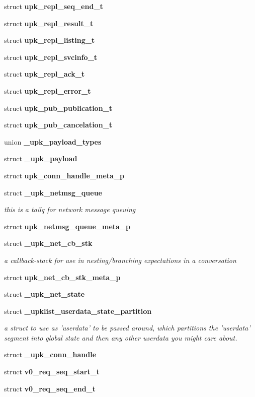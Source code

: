 \begin{DoxyCompactItemize}
\item 
struct {\bf upk\_\-repl\_\-seq\_\-end\_\-t}
\item 
struct {\bf upk\_\-repl\_\-result\_\-t}
\item 
struct {\bf upk\_\-repl\_\-listing\_\-t}
\item 
struct {\bf upk\_\-repl\_\-svcinfo\_\-t}
\item 
struct {\bf upk\_\-repl\_\-ack\_\-t}
\item 
struct {\bf upk\_\-repl\_\-error\_\-t}
\item 
struct {\bf upk\_\-pub\_\-publication\_\-t}
\item 
struct {\bf upk\_\-pub\_\-cancelation\_\-t}
\item 
union {\bf \_\-upk\_\-payload\_\-types}
\item 
struct {\bf \_\-upk\_\-payload}
\item 
struct {\bf upk\_\-conn\_\-handle\_\-meta\_\-p}
\item 
struct {\bf \_\-upk\_\-netmsg\_\-queue}
\begin{DoxyCompactList}\small\item\em this is a tailq for network message queuing \end{DoxyCompactList}\item 
struct {\bf upk\_\-netmsg\_\-queue\_\-meta\_\-p}
\item 
struct {\bf \_\-upk\_\-net\_\-cb\_\-stk}
\begin{DoxyCompactList}\small\item\em a callback-\/stack for use in nesting/branching expectations in a conversation \end{DoxyCompactList}\item 
struct {\bf upk\_\-net\_\-cb\_\-stk\_\-meta\_\-p}
\item 
struct {\bf \_\-upk\_\-net\_\-state}
\item 
struct {\bf \_\-upklist\_\-userdata\_\-state\_\-partition}
\begin{DoxyCompactList}\small\item\em a struct to use as 'userdata' to be passed around, which partitions the 'userdata' segment into global state and then any other userdata you might care about. \end{DoxyCompactList}\item 
struct {\bf \_\-upk\_\-conn\_\-handle}
\item 
struct {\bf v0\_\-req\_\-seq\_\-start\_\-t}
\item 
struct {\bf v0\_\-req\_\-seq\_\-end\_\-t}

\end{DoxyCompactItemize}

